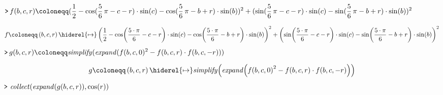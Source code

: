 \documentclass{article}
\theoremstyle{definition}
\newcounter{col}
\begin{document}
\mapleinput
{$ \displaystyle \texttt{>\,} f (b ,c ,r)\coloneqq (\frac{1}{2}-\cos (\frac{5}{6}\,\pi -c -r)\cdot \sin (c)-\cos (\frac{5}{6}\,\pi -b +r)\cdot \sin (b))^{2}+(\sin (\frac{5}{6}\,\pi -c -r)\cdot \sin (c)-\sin (\frac{5}{6}\,\pi -b +r)\cdot \sin (b))^{2}\, $}

\begin{dmath}\label{(1)'}
f \coloneqq \left(b ,c ,r \right)\hiderel{\mapsto }\left(\frac{1}{2}-\cos \! \left(\frac{5\cdot \pi}{6}-c -r \right)\cdot \sin \! \left(c \right)-\cos \! \left(\frac{5\cdot \pi}{6}-b +r \right)\cdot \sin \! \left(b \right)\right)^{2}+\left(\sin \! \left(\frac{5\cdot \pi}{6}-c -r \right)\cdot \sin \! \left(c \right)-\sin \! \left(\frac{5\cdot \pi}{6}-b +r \right)\cdot \sin \! \left(b \right)\right)^{2}
\end{dmath}
\mapleinput
{$ \displaystyle \texttt{>\,} g (b ,c ,r)\coloneqq \mathit{simplify} (\mathit{expand} (f (b ,c ,0)^{2}-f (b ,c ,r)\cdot f (b ,c ,-r)))\, $}

\begin{dmath}\label{(2)'}
g \coloneqq \left(b ,c ,r \right)\hiderel{\mapsto }\mathit{simplify} \! \left(\mathit{expand} \! \left(f \! \left(b ,c ,0\right)^{2}-f \! \left(b ,c ,r \right)\cdot f \! \left(b ,c ,-r \right)\right)\right)
\end{dmath}
\mapleinput
{$ \displaystyle \texttt{>\,} \,\mathit{collect} (\mathit{expand} (g (b ,c ,r)),\cos (r))\, $}
\end{document}
